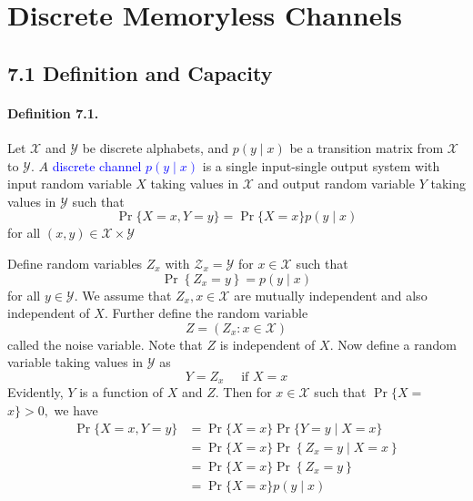 \documentclass[8pt]{article}
\begin{document}
\newpage
\section{Discrete Memoryless Channels}
\subsection{7.1 Definition and Capacity}
\begin{tcolorbox}
	\paragraph{Definition 7.1.} Let $\mathcal{X}$ and $\mathcal{Y}$ be discrete alphabets, and $p(y \mid x)$ be a transition matrix from $\mathcal{X}$ to $\mathcal{Y}$. $A$ \textcolor{blue}{discrete channel $p(y \mid x)$} is a single input-single output system with input random variable $X$ taking values in $\mathcal{X}$ and output random variable $Y$ taking values in $\mathcal{Y}$ such that
	$$
	\operatorname{Pr}\{X=x, Y=y\}=\operatorname{Pr}\{X=x\} p(y \mid x)
	$$
	for all $(x, y) \in \mathcal{X} \times \mathcal{Y}$
\end{tcolorbox}
Define random variables $Z_{x}$ with $\mathcal{Z}_{x}=\mathcal{Y}$ for $x \in \mathcal{X}$ such that
$$
\operatorname{Pr}\left\{Z_{x}=y\right\}=p(y \mid x)
$$
for all $y \in \mathcal{Y}$. We assume that $Z_{x}, x \in \mathcal{X}$ are mutually independent and also independent of $X .$ Further define the random variable
$$
Z=\left(Z_{x}: x \in \mathcal{X}\right)
$$
called the noise variable. Note that $Z$ is independent of $X .$ Now define a random variable taking values in $\mathcal{Y}$ as
$$
Y=Z_{x} \quad \text { if } X=x
$$
Evidently, $Y$ is a function of $X$ and $Z .$ Then for $x \in \mathcal{X}$ such that $\operatorname{Pr}\{X=$ $x\}>0,$ we have
$$
\begin{aligned}
\operatorname{Pr}\{X=x, Y=y\} &=\operatorname{Pr}\{X=x\} \operatorname{Pr}\{Y=y \mid X=x\} \\
&=\operatorname{Pr}\{X=x\} \operatorname{Pr}\left\{Z_{x}=y \mid X=x\right\} \\
&=\operatorname{Pr}\{X=x\} \operatorname{Pr}\left\{Z_{x}=y\right\} \\
&=\operatorname{Pr}\{X=x\} p(y \mid x)
\end{aligned}
$$
\end{document}
